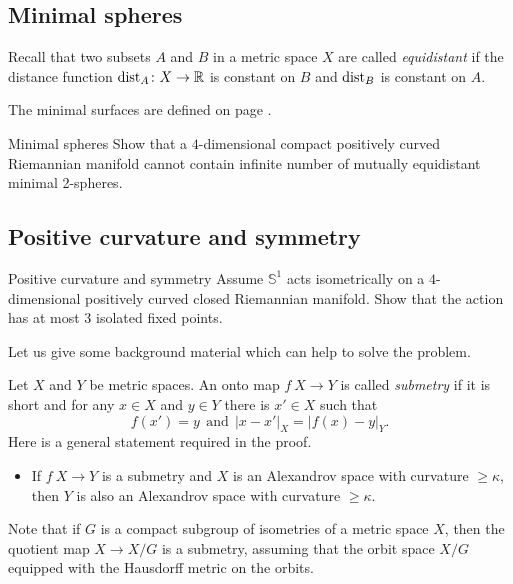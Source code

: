 \subsection*{Minimal spheres}


Recall that two subsets $A$ and $B$ in a metric space $X$ are called \emph{equidistant} if the distance function $\operatorname{\rm dist}_A\colon X\to\mathbb{R}$ is constant on $B$ and $\operatorname{\rm dist}_B$ is constant on $A$.

The minimal surfaces are defined on page \pageref{minimal surface}.

\begin{pr}{}{Minimal spheres}\label{Minimal spheres}
Show that a 
$4$-dimensional
compact 
positively curved 
Riemannian manifold 
cannot contain infinite number of  mutually
 equidistant minimal 2-spheres.
\end{pr}


\subsection*{Positive curvature and symmetry\thm}

\begin{pr}{\thm}{Positive curvature and symmetry}\label{kleiner-hopf} 
Assume $\mathbb S^1$ acts isometrically on a $4$-dimensional positively curved closed Riemannian manifold.
Show that the action 
has at most $3$ isolated fixed points.
\end{pr}

Let us give some background material which can help to solve the problem. 

Let $X$ and $Y$ be metric spaces.
An onto map $f\:X\to Y$ is called \emph{submetry} if it is short and 
for any $x\in X$ and $y\in Y$ there is $x'\in X$ such that 
\[f(x')=y\ \ \text{and}\ \  |x-x'|_X=|f(x)-y|_Y.\]
Here is a general statement required in the proof.

\begin{itemize}
\item If $f\:X\to Y$ is a  submetry
and $X$ is an Alexandrov space with curvature $\ge \kappa$, 
then $Y$ 
is also an Alexandrov space with curvature $\ge \kappa$.
\end{itemize}

Note that 
if  $G$ is a compact subgroup of isometries of a metric space $X$, 
then the quotient map $X\to X/G$ is a submetry,
assuming that the orbit space $X/G$ equipped with the Hausdorff metric on the orbits.

